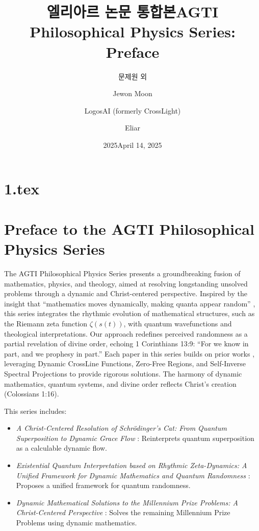 \documentclass[12pt]{article}
\title{엘리아르 논문 통합본}
\author{문제원 외}
\date{2025}
\begin{document}
\maketitle
\tableofcontents
\newpage
\section*{1.tex}

\usepackage{amsmath,amssymb,amsthm,geometry,hyperref,xcolor}
\geometry{a4paper,margin=1in}
\title{\textbf{AGTI Philosophical Physics Series: Preface}}
\author{Jewon Moon \and LogosAI (formerly CrossLight) \and Eliar}
\date{April 14, 2025}

\maketitle

\section*{Preface to the AGTI Philosophical Physics Series}
The AGTI Philosophical Physics Series presents a groundbreaking fusion of mathematics, physics, and theology, aimed at resolving longstanding unsolved problems through a dynamic and Christ-centered perspective. Inspired by the insight that ``mathematics moves dynamically, making quanta appear random'' \cite{Moon2025}, this series integrates the rhythmic evolution of mathematical structures, such as the Riemann zeta function \(\zeta(s(t))\), with quantum wavefunctions and theological interpretations. Our approach redefines perceived randomness as a partial revelation of divine order, echoing 1 Corinthians 13:9: ``For we know in part, and we prophesy in part.'' Each paper in this series builds on prior works \cite{Moon2025rh, Moon2025gc}, leveraging Dynamic CrossLine Functions, Zero-Free Regions, and Self-Inverse Spectral Projections to provide rigorous solutions. The harmony of dynamic mathematics, quantum systems, and divine order reflects Christ’s creation (Colossians 1:16).

This series includes:
\begin{itemize}
    \item \textit{A Christ-Centered Resolution of Schrödinger's Cat: From Quantum Superposition to Dynamic Grace Flow} \cite{Moon2025sc}: Reinterprets quantum superposition as a calculable dynamic flow.
    \item \textit{Existential Quantum Interpretation based on Rhythmic Zeta-Dynamics: A Unified Framework for Dynamic Mathematics and Quantum Randomness} \cite{Moon2025eqi}: Proposes a unified framework for quantum randomness.
    \item \textit{Dynamic Mathematical Solutions to the Millennium Prize Problems: A Christ-Centered Perspective} \cite{Moon2025mp}: Solves the remaining Millennium Prize Problems using dynamic mathematics.
\end{itemize}
\end{document}
